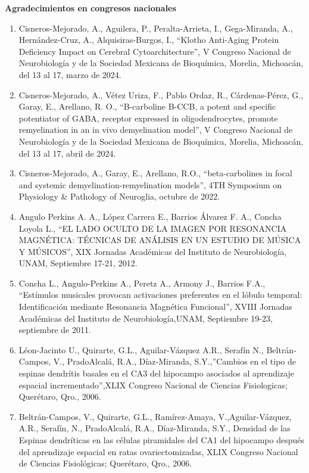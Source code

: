 {\large \textbf{Agradecimientos en congresos nacionales}}

\hrulefill

\begin{enumerate}

\item Cisneros-Mejorado, A., Aguilera, P., Peralta-Arrieta, I., Gega-Miranda, A., Hernández-Cruz, A., Alquisiras-Burgos, I., “Klotho 
Anti-Aging 
Protein Deficiency Impact on Cerebral Cytoarchitecture”, V Congreso Nacional de Neurobiología y de la Sociedad Mexicana de Bioquímica, 
Morelia, Michoacán, del 13 al 17, marzo de 2024.

\item Cisneros-Mejorado, A., Vétez Uriza, F., Pablo Ordaz, R., Cárdenas-Pérez, G., Garay, E., Arellano, R. O., “B-carboline B-CCB, a potent 
and 
specific potentiator of GABA, receptor expressed in oligodendrocytes, promote remyelination in an in vivo demyelination model”, V Congreso 
Nacional de Neurobiología y de la Sociedad Mexicana de Bioquímica, Morelia, Michoacán, del 13 al 17, abril de 2024.

\item Cisneros-Mejorado, A., Garay, E., Arellano, R.O., “beta-carbolines in focal and systemic demyelination-remyelination models”, 4TH 
Symposium 
on Physiology \& Pathology of Neuroglia, octubre de 2022.

\item Angulo Perkins A. A., López Carrera E., Barrios Álvarez F. A., Concha Loyola L., “EL LADO OCULTO DE LA IMAGEN POR RESONANCIA MAGNÉTICA: 
TÉCNICAS DE ANÁLISIS EN UN ESTUDIO DE MÚSICA Y MÚSICOS”, XIX Jornadas Académicas del Instituto de Neurobiología, UNAM, Septiembre 17-21, 
2012.

\item Concha L., Angulo-Perkins A., Peretz A., Armony J., Barrios F.A., “Estímulos musicales provocan activaciones preferentes en el lóbulo 
temporal: Identificación mediante Resonancia Magnética Funcional”, XVIII Jornadas Académicas del Instituto de Neurobiología,UNAM, Septiembre 
19-23, septiembre de 2011.

\item Léon-Jacinto U., Quirarte, G.L., Aguilar-Vázquez A.R., Serafín N., Beltrán-Campos, V., PradoAlcalá, R.A., Díaz-Miranda, S.Y.,”Cambios 
en el 
tipo de espinas dendrítis basales en el CA3 del hipocampo asociados al aprendizaje espacial incrementado”,XLIX Congreso Nacional de Ciencias 
Fisiologicas; Querétaro, Qro., 2006.

\item Beltrán-Campos, V., Quirarte, G.L., Ramírez-Amaya, V.,Aguilar-Vázquez, A.R., Serafín, N., PradoAlcalá, R.A., Díaz-Miranda, S.Y., 
Densidad de 
las Espinas dendríticas en las células piramidales del CA1 del hipocampo después del aprendizaje espacial en ratas ovariectomizadas, XLIX 
Congreso Nacional de Ciencias Fisiológicas; Querétaro, Qro., 2006.


\end{enumerate}
